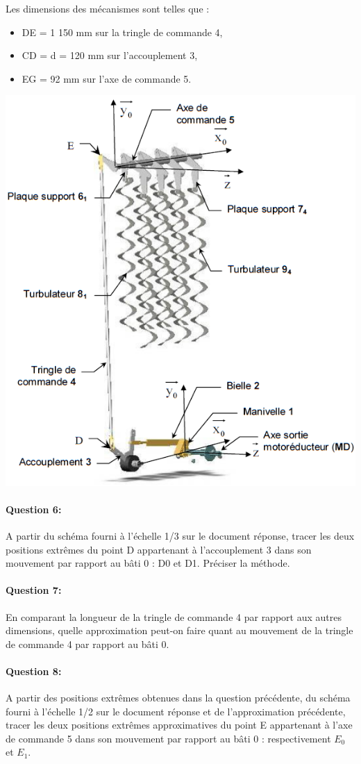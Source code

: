 Les dimensions des mécanismes sont telles que :
\begin{itemize}
 \item DE = 1 150 mm sur la tringle de commande 4,
 \item CD = d = 120 mm sur l'accouplement 3,
 \item EG = 92 mm sur l'axe de commande 5.
\end{itemize}

\begin{center}
	\includegraphics[width=0.6\linewidth]{img/Chaudiere_cinematique_4}
\end{center}

\paragraph{Question 6:} A partir du schéma fourni à l'échelle 1/3 sur le document réponse, tracer les deux positions extrêmes du point D appartenant à l'accouplement 3 dans son mouvement par rapport au bâti 0 : D0 et D1. Préciser la méthode.

\paragraph{Question 7:} En comparant la longueur de la tringle de commande 4 par rapport aux autres dimensions, quelle approximation peut-on faire quant au mouvement de la tringle de commande 4 par rapport au bâti 0.

\paragraph{Question 8:} A partir des positions extrêmes obtenues dans la question précédente, du schéma fourni à l'échelle 1/2 sur le document réponse et de l'approximation précédente, tracer les deux positions extrêmes approximatives du point E appartenant à l'axe de commande 5 dans son mouvement par rapport au bâti 0 : respectivement $E_0$ et $E_1$.

